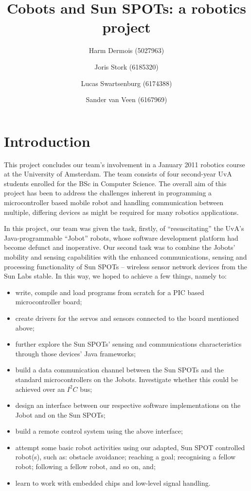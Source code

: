 \documentclass[a4paper,10pt]{article} %
\author{Harm Dermois (5027963) \and Joris Stork (6185320) \and
Lucas Swartsenburg (6174388) \and Sander van Veen (6167969)}
\title{Cobots and Sun SPOTs: a robotics project}
\begin{document}
\maketitle

\abstract{}

\pagebreak

\tableofcontents

\pagebreak

\section{Introduction} %

This project concludes our team's involvement in a January 2011 robotics course
at the University of Amsterdam. The team consists of four second-year UvA
students enrolled for the BSc in Computer Science. The overall aim of this
project has been to address the challenges inherent in programming a microcontroller
based mobile robot and handling communication between multiple, differing
devices as might be required for many robotics applications.

In this project, our team was given the task, firstly, of ``resuscitating'' the
UvA's Java-programmable ``Jobot'' robots, whose software development platform
had become defunct and inoperative. Our second task was to combine the Jobots'
mobility and sensing capabilities with the enhanced communications, sensing and
processing functionality of Sun SPOTs -- wireless sensor network devices from
the Sun Labs stable. In this way, we hoped to achieve a few things, namely to:

\begin{itemize}
    \item write, compile and load programs from scratch for a PIC based
    microcontroller board;
    \item create drivers for the servos and sensors connected to the board
    mentioned above;
    \item further explore the Sun SPOTs' sensing and communications
    characteristics through those devices' Java frameworks;
    \item build a data communication channel between the Sun SPOTs and the
    standard microcontrollers on the Jobots. Investigate whether this could be
    achieved over an $I^2C$ bus;
    \item design an interface between our respective software implementations on
    the Jobot and on the Sun SPOTs;
    \item build a remote control system using the above interface;
    \item attempt some basic robot activities using our adapted, Sun SPOT
    controlled robot(s), such as: obstacle avoidance; reaching a goal;
    recognising a fellow robot; following a fellow robot, and so on, and;
    \item learn to work with embedded chips and low-level signal handling.
\end{itemize}
\end{document}
